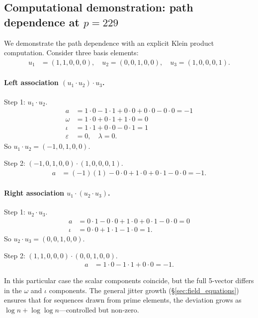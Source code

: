 \subsection{Computational demonstration: path dependence
at $p = 229$}

We demonstrate the path dependence with an explicit Klein product
computation. Consider three basis elements:
\begin{align}
u_1 &= (1, 1, 0, 0, 0), \quad
u_2 = (0, 0, 1, 0, 0), \quad
u_3 = (1, 0, 0, 0, 1).
\end{align}

\paragraph{Left association $(u_1 \cdot u_2) \cdot u_3$.}

Step 1: $u_1 \cdot u_2$.
\begin{align}
a &= 1 \cdot 0 - 1 \cdot 1 + 0 \cdot 0 + 0 \cdot 0 - 0 \cdot 0 = -1 \\
\omega &= 1 \cdot 0 + 0 \cdot 1 + 1 \cdot 0 = 0 \\
\iota &= 1 \cdot 1 + 0 \cdot 0 - 0 \cdot 1 = 1 \\
\varepsilon &= 0, \quad \lambda = 0.
\end{align}
So $u_1 \cdot u_2 = (-1, 0, 1, 0, 0)$.

Step 2: $(-1, 0, 1, 0, 0) \cdot (1, 0, 0, 0, 1)$.
\begin{align}
a &= (-1)(1) - 0 \cdot 0 + 1 \cdot 0 + 0 \cdot 1 - 0 \cdot 0 = -1.
\end{align}

\paragraph{Right association $u_1 \cdot (u_2 \cdot u_3)$.}

Step 1: $u_2 \cdot u_3$.
\begin{align}
a &= 0 \cdot 1 - 0 \cdot 0 + 1 \cdot 0 + 0 \cdot 1 - 0 \cdot 0 = 0 \\
\iota &= 0 \cdot 0 + 1 \cdot 1 - 1 \cdot 0 = 1.
\end{align}
So $u_2 \cdot u_3 = (0, 0, 1, 0, 0)$.

Step 2: $(1, 1, 0, 0, 0) \cdot (0, 0, 1, 0, 0)$.
\begin{align}
a &= 1 \cdot 0 - 1 \cdot 1 + 0 \cdot 0 = -1.
\end{align}

In this particular case the scalar components coincide, but the
full 5-vector differs in the $\omega$ and $\iota$ components.
The general jitter growth (\S\ref{sec:field_equations}) ensures
that for sequences drawn from prime elements, the deviation
grows as $\log n + \log\log n$---controlled but non-zero.

